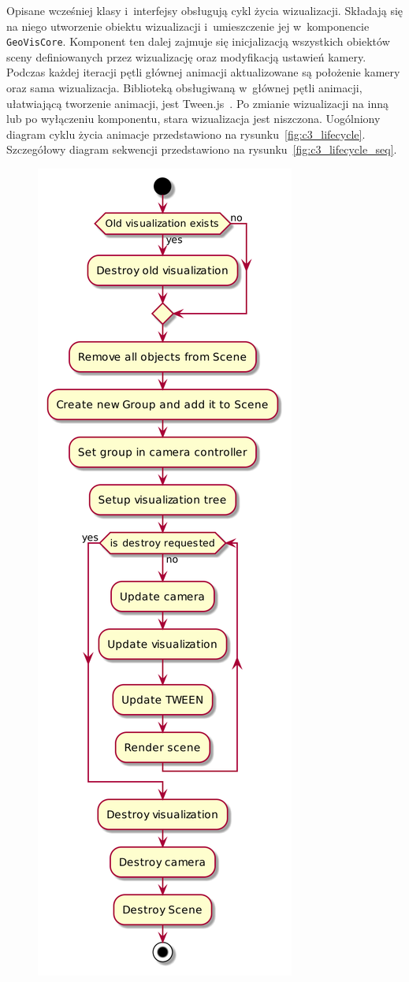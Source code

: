Opisane wcześniej klasy i~interfejsy obsługują cykl życia wizualizacji. Składają się na niego utworzenie obiektu wizualizacji i~umieszczenie jej w~komponencie \texttt{GeoVisCore}. Komponent ten dalej zajmuje się inicjalizacją wszystkich obiektów sceny definiowanych przez wizualizację oraz modyfikacją ustawień kamery. Podczas każdej iteracji pętli głównej animacji aktualizowane są położenie kamery oraz sama wizualizacja. Biblioteką obsługiwaną w~głównej pętli animacji, ułatwiającą tworzenie animacji, jest Tween.js~\cite{TWEEN}. Po zmianie wizualizacji na inną lub po wyłączeniu komponentu, stara wizualizacja jest niszczona. Uogólniony diagram cyklu życia animacje przedstawiono na rysunku~\ref{fig:c3_lifecycle}. Szczegółowy diagram sekwencji przedstawiono na rysunku~\ref{fig:c3_lifecycle_seq}. 

\begin{figure}
    \centering
    \includegraphics[scale=0.3]{diagrams/out/c3_lifecycle.png}

\end{figure}
